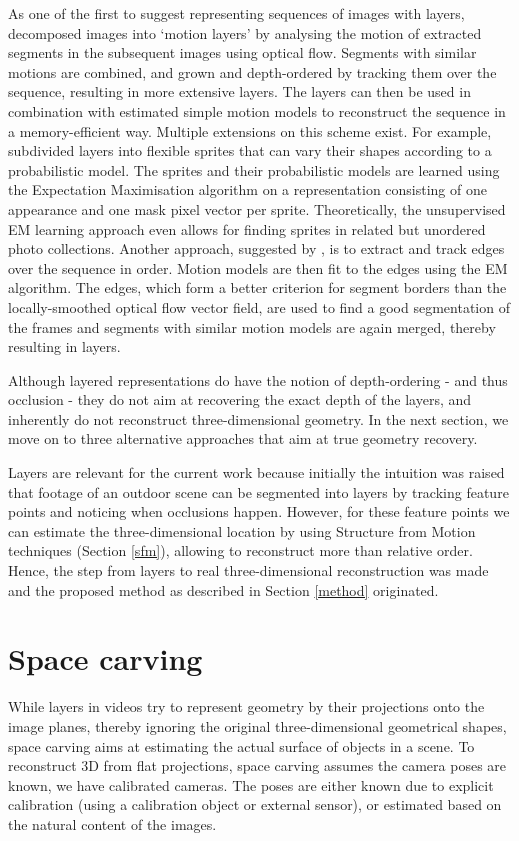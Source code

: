 As one of the first to suggest representing sequences of images with layers,  decomposed images into `motion layers' by analysing the motion of extracted segments in the subsequent images using optical flow. Segments with similar motions are combined, and grown and depth-ordered by tracking them over the sequence, resulting in more extensive layers. The layers can then be used in combination with estimated simple motion models to reconstruct the sequence in a memory-efficient way. Multiple extensions on this scheme exist. For example,  subdivided layers into flexible sprites that can vary their shapes according to a probabilistic model. The sprites and their probabilistic models are learned using the Expectation Maximisation algorithm on a representation consisting of one appearance and one mask pixel vector per sprite. Theoretically, the unsupervised EM learning approach even allows for finding sprites in related but unordered photo collections. Another approach, suggested by , is to extract and track edges over the sequence in order. Motion models are then fit to the edges using the EM algorithm. The edges, which form a better criterion for segment borders than the locally-smoothed optical flow vector field, are used to find a good segmentation of the frames and segments with similar motion models are again merged, thereby resulting in layers.

Although layered representations do have the notion of depth-ordering - and thus occlusion - they do not aim at recovering the exact depth of the layers, and inherently do not reconstruct three-dimensional geometry. In the next section, we move on to three alternative approaches that aim at true geometry recovery.

Layers are relevant for the current work because initially the intuition was raised that footage of an outdoor scene can be segmented into layers by tracking feature points and noticing when occlusions happen. However, for these feature points we can estimate the three-dimensional location by using Structure from Motion techniques (Section \ref{sfm}), allowing to reconstruct more than relative order. Hence, the step from layers to real three-dimensional reconstruction was made and the proposed method as described in Section \ref{method} originated.


\pagebreak
\section{Space carving}  \label{carving}
While layers in videos try to represent geometry by their projections onto the image planes, thereby ignoring the original three-dimensional geometrical shapes, space carving aims at estimating the actual surface of objects in a scene. To reconstruct 3D from flat projections, space carving assumes the camera poses are known, \ie we have calibrated cameras. The poses are either known due to explicit calibration (using a calibration object or external sensor), or estimated based on the natural content of the images.


